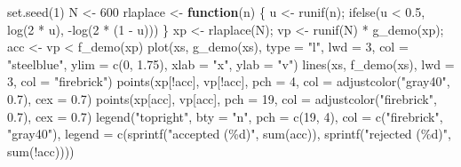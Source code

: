\documentclass[
  letterpaper,
  DIV=11,
  numbers=noendperiod]{scrreprt}
\newenvironment{Shaded}{\begin{snugshade}}{\end{snugshade}}
\newcommand{\AttributeTok}[1]{\textcolor[rgb]{0.40,0.45,0.13}{#1}}
\newcommand{\ControlFlowTok}[1]{\textcolor[rgb]{0.00,0.23,0.31}{\textbf{#1}}}
\newcommand{\DecValTok}[1]{\textcolor[rgb]{0.68,0.00,0.00}{#1}}
\newcommand{\FloatTok}[1]{\textcolor[rgb]{0.68,0.00,0.00}{#1}}
\newcommand{\FunctionTok}[1]{\textcolor[rgb]{0.28,0.35,0.67}{#1}}
\newcommand{\NormalTok}[1]{\textcolor[rgb]{0.00,0.23,0.31}{#1}}
\newcommand{\OtherTok}[1]{\textcolor[rgb]{0.00,0.23,0.31}{#1}}
\newcommand{\SpecialCharTok}[1]{\textcolor[rgb]{0.37,0.37,0.37}{#1}}
\newcommand{\StringTok}[1]{\textcolor[rgb]{0.13,0.47,0.30}{#1}}
\begin{document}
\begin{Shaded}
\begin{Highlighting}[]
\FunctionTok{set.seed}\NormalTok{(}\DecValTok{1}\NormalTok{)}
\NormalTok{N }\OtherTok{\textless{}{-}} \DecValTok{600}
\NormalTok{rlaplace }\OtherTok{\textless{}{-}} \ControlFlowTok{function}\NormalTok{(n) \{ u }\OtherTok{\textless{}{-}} \FunctionTok{runif}\NormalTok{(n); }\FunctionTok{ifelse}\NormalTok{(u }\SpecialCharTok{\textless{}} \FloatTok{0.5}\NormalTok{, }\FunctionTok{log}\NormalTok{(}\DecValTok{2} \SpecialCharTok{*}\NormalTok{ u), }\SpecialCharTok{{-}}\FunctionTok{log}\NormalTok{(}\DecValTok{2} \SpecialCharTok{*}\NormalTok{ (}\DecValTok{1} \SpecialCharTok{{-}}\NormalTok{ u))) \}}
\NormalTok{xp }\OtherTok{\textless{}{-}} \FunctionTok{rlaplace}\NormalTok{(N); vp }\OtherTok{\textless{}{-}} \FunctionTok{runif}\NormalTok{(N) }\SpecialCharTok{*} \FunctionTok{g\_demo}\NormalTok{(xp); acc }\OtherTok{\textless{}{-}}\NormalTok{ vp }\SpecialCharTok{\textless{}} \FunctionTok{f\_demo}\NormalTok{(xp)}
\FunctionTok{plot}\NormalTok{(xs, }\FunctionTok{g\_demo}\NormalTok{(xs), }\AttributeTok{type =} \StringTok{"l"}\NormalTok{, }\AttributeTok{lwd =} \DecValTok{3}\NormalTok{, }\AttributeTok{col =} \StringTok{"steelblue"}\NormalTok{, }\AttributeTok{ylim =} \FunctionTok{c}\NormalTok{(}\DecValTok{0}\NormalTok{, }\FloatTok{1.75}\NormalTok{), }\AttributeTok{xlab =} \StringTok{"x"}\NormalTok{, }\AttributeTok{ylab =} \StringTok{"v"}\NormalTok{)}
\FunctionTok{lines}\NormalTok{(xs, }\FunctionTok{f\_demo}\NormalTok{(xs), }\AttributeTok{lwd =} \DecValTok{3}\NormalTok{, }\AttributeTok{col =} \StringTok{"firebrick"}\NormalTok{)}
\FunctionTok{points}\NormalTok{(xp[}\SpecialCharTok{!}\NormalTok{acc], vp[}\SpecialCharTok{!}\NormalTok{acc], }\AttributeTok{pch =} \DecValTok{4}\NormalTok{, }\AttributeTok{col =} \FunctionTok{adjustcolor}\NormalTok{(}\StringTok{"gray40"}\NormalTok{, }\FloatTok{0.7}\NormalTok{), }\AttributeTok{cex =} \FloatTok{0.7}\NormalTok{)}
\FunctionTok{points}\NormalTok{(xp[acc], vp[acc], }\AttributeTok{pch =} \DecValTok{19}\NormalTok{, }\AttributeTok{col =} \FunctionTok{adjustcolor}\NormalTok{(}\StringTok{"firebrick"}\NormalTok{, }\FloatTok{0.7}\NormalTok{), }\AttributeTok{cex =} \FloatTok{0.7}\NormalTok{)}
\FunctionTok{legend}\NormalTok{(}\StringTok{"topright"}\NormalTok{, }\AttributeTok{bty =} \StringTok{"n"}\NormalTok{, }\AttributeTok{pch =} \FunctionTok{c}\NormalTok{(}\DecValTok{19}\NormalTok{, }\DecValTok{4}\NormalTok{), }\AttributeTok{col =} \FunctionTok{c}\NormalTok{(}\StringTok{"firebrick"}\NormalTok{, }\StringTok{"gray40"}\NormalTok{),}
       \AttributeTok{legend =} \FunctionTok{c}\NormalTok{(}\FunctionTok{sprintf}\NormalTok{(}\StringTok{"accepted (\%d)"}\NormalTok{, }\FunctionTok{sum}\NormalTok{(acc)), }\FunctionTok{sprintf}\NormalTok{(}\StringTok{"rejected (\%d)"}\NormalTok{, }\FunctionTok{sum}\NormalTok{(}\SpecialCharTok{!}\NormalTok{acc))))}
\end{Highlighting}
\end{Shaded}
\end{document}
